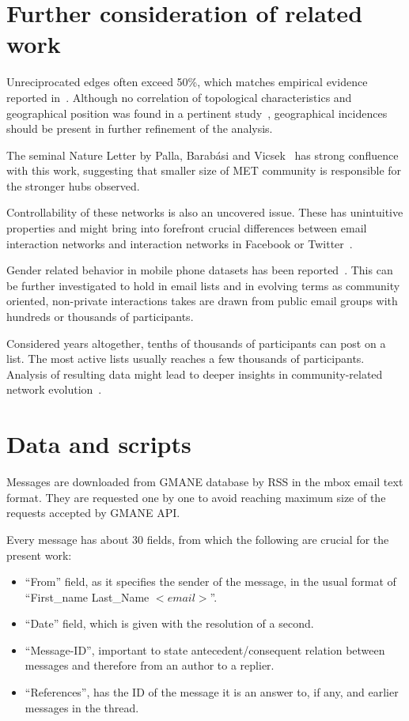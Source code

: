 \documentclass[%
 aip,
 jmp,%
 amsmath,amssymb,
 reprint,%
]{revtex4-1}
\begin{document}
\section{Further consideration of related work}\label{sec:fure}
Unreciprocated edges often exceed 50\%, which matches empirical evidence reported in~\cite{newmanEvolving}. Although no correlation of topological characteristics and geographical position was found in a pertinent study~\cite{barabasiGeo}, geographical incidences should be present in further refinement of the analysis.

The seminal Nature Letter by Palla, Barab{\'a}si and Vicsek~\cite{barabasiEvo} has strong confluence with this work, suggesting that smaller size of MET community is responsible for the stronger hubs observed.

Controllability of these networks is also an uncovered issue. These has unintuitive properties and might bring into forefront crucial differences between email interaction networks and interaction networks in Facebook or Twitter~\cite{barabasiControlCapacity,barabasiControlCentrality,barabasiControllability}.

Gender related behavior in mobile phone datasets has been reported~\cite{barabasiSex}. This can be further investigated to hold in email lists and in evolving terms as community oriented, non-private interactions takes are drawn from public email groups with hundreds or thousands of participants. 

Considered years altogether, tenths of thousands of participants can post on a list. The most active lists usually reaches a few thousands of participants. Analysis of resulting data might lead to deeper insights in community-related network evolution~\cite{GMANE}.

\section{Data and scripts}\label{scripts}
Messages are downloaded from GMANE database by RSS in the mbox email text format. 
They are requested one by one to avoid reaching maximum size of the requests accepted by
GMANE API. 

Every message has about 30 fields, from which the following are crucial
for the present work:
\begin{itemize}
    \item ``From'' field, as it specifies the sender of the message, in the usual format of ``First\_name Last\_Name $<email>$''.
    \item ``Date'' field, which is given with the resolution of a second.
    \item ``Message-ID'', important to state antecedent/consequent relation between messages and therefore from an author to a replier.
    \item ``References'', has the ID of the message it is an answer to, if any, and earlier messages in the thread.
\end{itemize}
\end{document}
